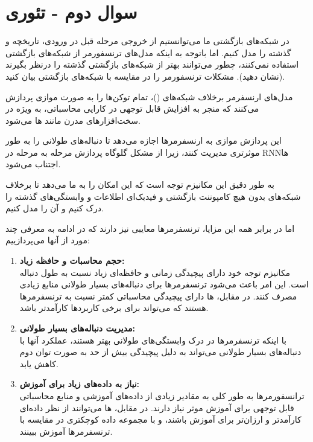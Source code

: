 \section{سوال دوم - تئوری}

در شبکه‌های بازگشتی ما می‌توانستیم از خروجی مرحله قبل در ورودی، تاریخچه و گذشته را مدل کنیم. اما باتوجه به اینکه مدل‌های ترنسفورمر از شبکه‌های بازگشتی استفاده نمی‌کنند، چطور می‌توانند بهتر از شبکه‌های بازگشتی گذشته را درنظر بگیرند (نشان دهید). مشکلات ترنسفورمر را در مقایسه با شبکه‌های بازگشتی بیان کنید.




\begin{qsolve}
مدل‌های ارنسفرمر برخلاف شبکه‌های ()، تمام توکن‌ها را به صورت موازی پردازش می‌کنند که منجر به افزایش قابل توجهی در کارایی محاسباتی، به ویژه در سخت‌افزارهای مدرن مانند ها می‌شود.

این پردازش موازی به ارنسفرمرها اجازه می‌دهد تا دنباله‌های طولانی را به طور موثرتری مدیریت کنند، زیرا از مشکل گلوگاه پردازش مرحله به مرحله در RNNها اجتناب می‌شود.

به طور دقیق این مکانیزم توجه است که این امکان را به ما می‌دهد تا برخلاف شبکه‌های  بدون هیچ کامپوننت بازگشتی و فیدبک‌ای اطلاعات و وابستگی‌های گذشته را درک کنیم و آن را مدل کنیم.

اما در برابر همه این مزایا، ترنسفرمرها معایبی نیز دارند که در ادامه به معرفی چند مورد از آنها می‌پردازییم:


\begin{enumerate}
	\item \textbf{حجم محاسبات و حافظه زیاد: }\\
مکانیزم توجه خود دارای پیچیدگی زمانی و حافظه‌ای زیاد نسبت به طول دنباله است. این امر باعث می‌شود ترنسفرمرها برای دنباله‌های بسیار طولانی منابع زیادی مصرف کنند. در مقابل،  ها دارای پیچیدگی محاسباتی کمتر نسبت به ترنسفرمر‌ها هستند که می‌تواند برای برخی کاربرد‌ها کارآمدتر باشد.



	\item \textbf{مدیریت دنباله‌های بسیار طولانی:}\\
با اینکه ترنسفرمرها در درک وابستگی‌های طولانی بهتر هستند، عملکرد آنها با دنباله‌های بسیار طولانی می‌تواند به دلیل پیچیدگی بیش از حد به صورت توان دوم کاهش یابد.


	\item \textbf{نیاز به داده‌های زیاد برای آموزش: }\\
ترانسفورمرها به طور کلی به مقادیر زیادی از داده‌های آموزشی و منابع محاسباتی قابل توجهی برای آموزش موثر نیاز دارند. در مقابل، ها می‌توانند از نظر داده‌ای کارآمدتر و ارزان‌تر برای آموزش باشند، و با مجموعه داده کوچکتری در مقایسه با ترنسفرمر‌ها آموزش ببینند.
\end{enumerate}


\end{qsolve}